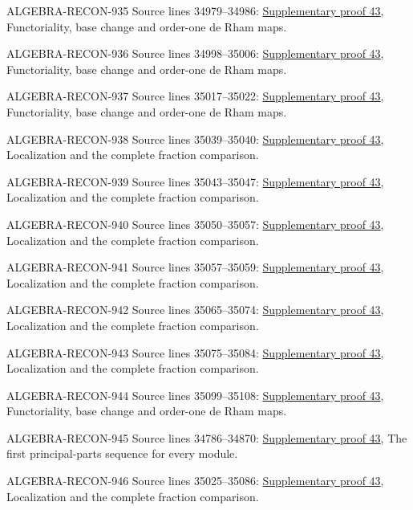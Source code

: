 \begin{AlgebraSourceRoutes}
\item[ALGEBRA-RECON-935] Source lines 34979--34986: \hyperlink{algebra_diff_operators_notes_20260928}{Supplementary proof 43}, Functoriality, base change and order-one de Rham maps.
\item[ALGEBRA-RECON-936] Source lines 34998--35006: \hyperlink{algebra_diff_operators_notes_20260928}{Supplementary proof 43}, Functoriality, base change and order-one de Rham maps.
\item[ALGEBRA-RECON-937] Source lines 35017--35022: \hyperlink{algebra_diff_operators_notes_20260928}{Supplementary proof 43}, Functoriality, base change and order-one de Rham maps.
\item[ALGEBRA-RECON-938] Source lines 35039--35040: \hyperlink{algebra_diff_operators_notes_20260928}{Supplementary proof 43}, Localization and the complete fraction comparison.
\item[ALGEBRA-RECON-939] Source lines 35043--35047: \hyperlink{algebra_diff_operators_notes_20260928}{Supplementary proof 43}, Localization and the complete fraction comparison.
\item[ALGEBRA-RECON-940] Source lines 35050--35057: \hyperlink{algebra_diff_operators_notes_20260928}{Supplementary proof 43}, Localization and the complete fraction comparison.
\item[ALGEBRA-RECON-941] Source lines 35057--35059: \hyperlink{algebra_diff_operators_notes_20260928}{Supplementary proof 43}, Localization and the complete fraction comparison.
\item[ALGEBRA-RECON-942] Source lines 35065--35074: \hyperlink{algebra_diff_operators_notes_20260928}{Supplementary proof 43}, Localization and the complete fraction comparison.
\item[ALGEBRA-RECON-943] Source lines 35075--35084: \hyperlink{algebra_diff_operators_notes_20260928}{Supplementary proof 43}, Localization and the complete fraction comparison.
\item[ALGEBRA-RECON-944] Source lines 35099--35108: \hyperlink{algebra_diff_operators_notes_20260928}{Supplementary proof 43}, Functoriality, base change and order-one de Rham maps.
\item[ALGEBRA-RECON-945] Source lines 34786--34870: \hyperlink{algebra_diff_operators_notes_20260928}{Supplementary proof 43}, The first principal-parts sequence for every module.
\item[ALGEBRA-RECON-946] Source lines 35025--35086: \hyperlink{algebra_diff_operators_notes_20260928}{Supplementary proof 43}, Localization and the complete fraction comparison.

\end{AlgebraSourceRoutes}
